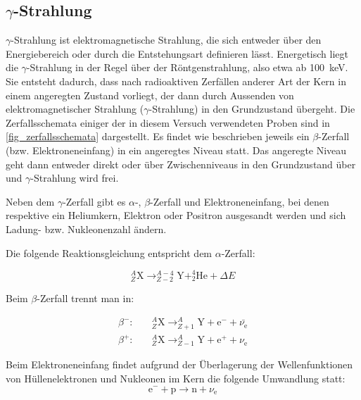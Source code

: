 \documentclass[
	a4paper,
	12pt,
	pagesize,
	ngerman
]{scrartcl}
\begin{document}
	\subsection{$\gamma$-Strahlung}
	$\gamma$-Strahlung ist elektromagnetische Strahlung, die sich entweder über den Energiebereich oder durch die Entstehungsart definieren lässt.
	Energetisch liegt die $\gamma$-Strahlung in der Regel über der Röntgenstrahlung, also etwa ab \SI{100}{keV}.
	Sie entsteht dadurch, dass nach radioaktiven Zerfällen anderer Art der Kern in einem angeregten Zustand vorliegt, der dann durch Aussenden von elektromagnetischer Strahlung ($\gamma$-Strahlung) in den Grundzustand übergeht.
	Die Zerfallsschemata einiger der in diesem Versuch verwendeten Proben sind in \cref{fig_zerfallsschemata} dargestellt.
	Es findet wie beschrieben jeweils ein $\beta$-Zerfall (bzw. Elektroneneinfang) in ein angeregtes Niveau statt.
	Das angeregte Niveau geht dann entweder direkt oder über Zwischenniveaus in den Grundzustand über und $\gamma$-Strahlung wird frei.

	Neben dem $\gamma$-Zerfall gibt es $\alpha$-, $\beta$-Zerfall und Elektroneneinfang, bei denen respektive ein Heliumkern, Elektron oder Positron ausgesandt werden und sich Ladung- bzw. Nukleonenzahl ändern.

	Die folgende Reaktionsgleichung entspricht dem $\alpha$-Zerfall:

	\begin{equation}
		\label{eq_alphazerfall}
		 _{Z}^{A}\text{X} \rightarrow _{Z-2}^{A-4}\text{Y} + _{2}^{4}\text{He} +\Delta E
	\end{equation}

	Beim $\beta$-Zerfall trennt man in:

	\begin{align}
		\label{eq_beta-minus}
		\beta^-: \quad & _{Z}^{A}\text{X} \rightarrow _{Z+1}^{A}\text{Y} + \text{e}^- + \bar{\nu_{\text{e}}}\\
		\beta^+: \quad & _{Z}^{A}\text{X} \rightarrow _{Z-1}^{A}\text{Y} + \text{e}^+ + \nu_{\text{e}}
	\end{align}

	Beim Elektroneneinfang findet aufgrund der Überlagerung der Wellenfunktionen von Hüllenelektronen und Nukleonen im Kern die folgende Umwandlung statt:
	\begin{equation}
		\label{eq_elec_cap}
		\text{e}^- + \text{p} \rightarrow \text{n} + \nu_{\text{e}}
	\end{equation}
\end{document}

